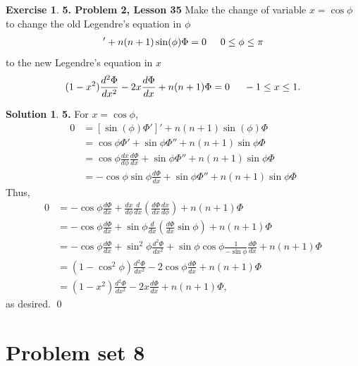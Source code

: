\documentclass{book}
\theoremstyle{definition}
\newtheorem*{exer*}{Exercise}
\newtheorem*{sln*}{Solution}
\newcommand{\f}[2]{\frac{#1}{#2}}
\newcommand{\lp}{\left(}
\newcommand{\rp}{\right)}
\begin{document}
\begin{exer*}\textbf{5. Problem 2, Lesson 35} 
	Make the change of variable $x = \cos\phi$ to change the old Legendre's equation in $\phi$
	\begin{align*}
	[\sin(\phi)\Phi']' + n(n+1)\sin(\phi)\Phi = 0 \hspace{0.5cm} 0 \leq \phi \leq \pi
	\end{align*}
	to the new Legendre's equation in $x$
	\begin{align*}
	(1-x^2)\f{d^2\Phi}{dx^2} -2x\f{d\Phi}{dx} + n(n+1)\Phi = 0 \hspace{0.5cm} -1 \leq x \leq 1.
	\end{align*}
	
	\begin{sln*}\textbf{5. } For $x = \cos\phi$,
	\begin{align*}
	0&=[\sin(\phi)\Phi']' + n(n+1)\sin(\phi)\Phi\\		
	&= \cos\phi \Phi' + \sin\phi \Phi'' + n(n+1)\sin\phi \Phi\\
	&= \cos\phi \f{dx}{d\phi}\f{d\Phi}{dx} + \sin\phi \Phi'' + n(n+1)\sin\phi \Phi\\
	&= -\cos\phi \sin\phi\f{d\Phi}{dx} + \sin\phi \Phi'' + n(n+1)\sin\phi \Phi
	\end{align*}
	Thus,
	\begin{align*}
	0&= -\cos\phi\f{d\Phi}{dx} + \f{dx}{d\phi}\f{d}{dx}\lp  \f{d\Phi}{dx}\f{dx}{d\phi} \rp + n(n+1)\Phi\\
	&= -\cos\phi\f{d\Phi}{dx} + \sin\phi \f{d}{dx}\lp \f{d\Phi}{dx}\sin\phi \rp + n(n+1)\Phi\\
	&= -\cos\phi\f{d\Phi}{dx} + \sin^2\phi \f{d^2\Phi}{dx^2} + \sin\phi \cos\phi \f{1}{-\sin\phi}\f{d\Phi}{dx} + n(n+1)\Phi\\
	&= (1-\cos^2\phi)\f{d^2\Phi}{dx^2} -2\cos\phi\f{d\Phi}{dx} + n(n+1)\Phi\\
	&= (1-x^2)\f{d^2\Phi}{dx^2} -2x\f{d\Phi}{dx} + n(n+1)\Phi,
	\end{align*}
	as desired. \qed
	
\end{sln*}
	

\end{exer*}


\newpage
\section{Problem set 8}
\end{document}
